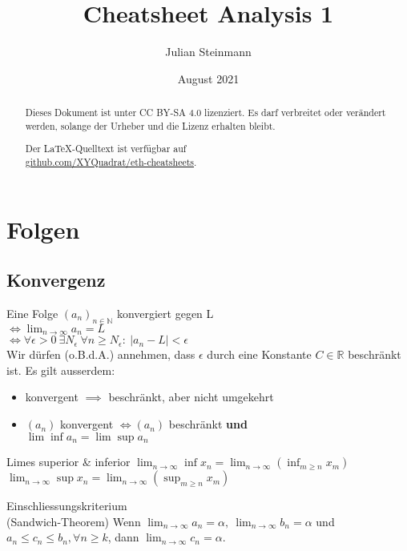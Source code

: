 \documentclass[a4paper,10pt]{article}
\title{Cheatsheet Analysis 1}
\author{Julian Steinmann}
\date{August 2021}
\def\limn{\lim_{n\to \infty}}
\def\R{\mathbb{R}}
\begin{document}
\maketitle

\renewcommand{\abstractname}{Lizenz}
\begin{abstract}
 Dieses Dokument ist unter CC BY-SA 4.0 lizenziert. Es darf verbreitet oder verändert werden, solange der Urheber und die Lizenz erhalten bleibt. \\

 \begin{center}
 Der \LaTeX-Quelltext ist verfügbar auf \\ \href{https://github.com/XYQuadrat/eth-cheatsheets}{github.com/XYQuadrat/eth-cheatsheets}.
 \end{center}
\end{abstract}

\section{Folgen}
\subsection{Konvergenz}
Eine Folge $(a_n)_{n\in \mathbb{N}}$ konvergiert gegen L \\ $\iff \lim_{n \to \infty} a_n = L $ \\ $\iff \forall \epsilon > 0 \ \exists N_\epsilon \ \forall n \ge N_\epsilon : \ | a_n - L | < \epsilon$\\

Wir dürfen (o.B.d.A.) annehmen, dass $\epsilon$ durch eine Konstante $C \in \R$ beschränkt ist.
Es gilt ausserdem:
\begin{itemize}
 \item konvergent $\implies$ beschränkt, aber nicht umgekehrt
 \item $(a_n)$ konvergent $\iff (a_n)$ beschränkt \textbf{und} \\$\lim \inf a_n = \lim \sup a_n$
\end{itemize}


\begin{subbox}{Limes superior \& inferior}
$\limn \inf x_n = \limn \left( \inf_{m \ge n} x_m \right)$ \\
$\limn \sup x_n = \limn \left( \sup_{m \ge n} x_m \right)$
\end{subbox}

\begin{mainbox}{Einschliessungskriterium \\ (Sandwich-Theorem)}
Wenn $\limn a_n = \alpha, \ \limn b_n = \alpha$ und $a_n \le c_n \le b_n, \forall n \ge k$, dann $\limn c_n = \alpha$.
\end{mainbox}
\end{document}
